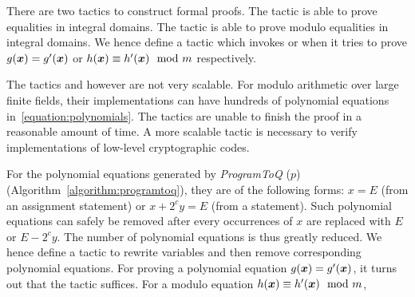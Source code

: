 There are two \coq tactics to
construct formal proofs. The tactic  is able to prove
equalities in integral domains. The tactic  is able
to prove modulo equalities in integral domains. We hence define a
\coq tactic which invokes  or  when
it tries to prove $g (\vx) = g' (\vx)$ or $h (\vx) \equiv
h' (\vx) \mod m$ respectively.

The tactics  and  however are not very
scalable.  
For modulo arithmetic over large finite fields, their 
implementations can have hundreds of polynomial equations
in~\ref{equation:polynomials}. The \coq tactics are unable to finish
the proof in a reasonable amount of time. A more scalable tactic is
necessary to verify implementations of low-level cryptographic codes.

For the polynomial equations generated by \textit{ProgramToQ}
($p$) (Algorithm~\ref{algorithm:programtoq}), they are of the
following forms: $x = E$ (from an assignment statement) or $x + 2^c y
= E$ (from a  statement). Such polynomial equations can
safely be removed after every occurrences of $x$ are replaced with $E$
or $E - 2^c y$. The number of polynomial equations is thus greatly
reduced. We hence define a \coq tactic to rewrite variables and then
remove corresponding polynomial equations. For proving a polynomial
equation $g (\vx) = g' (\vx)$, it turns out that the \coq tactic
 suffices. For a modulo equation $h (\vx) \equiv
h' (\vx) \mod m$, 
